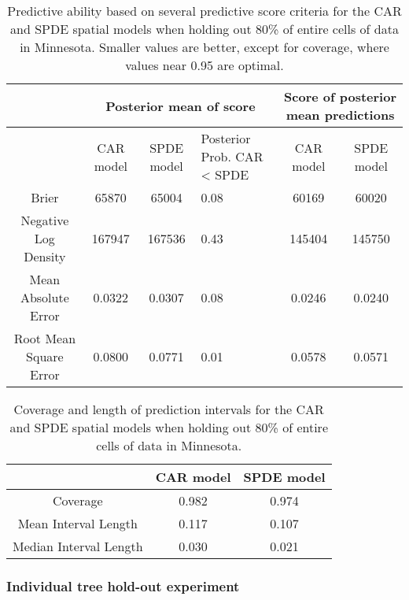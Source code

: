 \documentclass[12pt]{article}\usepackage[]{graphicx}\usepackage[]{color}
\providecommand{\tabularnewline}{\\}
\begin{document}
%
\begin{table}
\caption{Predictive ability based on several predictive score criteria for
the CAR and SPDE spatial models when holding out 80\% of entire cells
of data in Minnesota. Smaller values are better, except for coverage,
where values near 0.95 are optimal.}


\begin{tabular}{|c|c|c|>{\centering}p{3cm}|c|c|}
\hline 
 &
\multicolumn{3}{c|}{{\small{Posterior mean of score}}} &
\multicolumn{2}{c|}{{\small{Score of posterior mean predictions}}}\tabularnewline
\hline 
\hline 
 &
{\small{CAR model}} &
{\small{SPDE model}} &
{\small{Posterior Prob. CAR < SPDE}} &
{\small{CAR model}} &
{\small{SPDE model}}\tabularnewline
\hline 
{\small{Brier}} &
{\small{65870}} &
{\small{65004}} &
{\small{0.08}} &
{\small{60169}} &
{\small{60020}}\tabularnewline
\hline 
{\small{Negative Log Density}} &
{\small{167947}} &
{\small{167536}} &
{\small{0.43}} &
{\small{145404}} &
{\small{145750}}\tabularnewline
\hline 
{\small{Mean Absolute Error}} &
{\small{0.0322}} &
{\small{0.0307}} &
{\small{0.08}} &
{\small{0.0246}} &
{\small{0.0240}}\tabularnewline
\hline 
{\small{Root Mean Square Error}} &
{\small{0.0800}} &
{\small{0.0771}} &
{\small{0.01}} &
{\small{0.0578}} &
{\small{0.0571}}\tabularnewline
\hline 
\end{tabular}

\label{tab:score_cell_20percent}
\end{table}


\begin{table}
\caption{Coverage and length of prediction intervals for the CAR and SPDE spatial
models when holding out 80\% of entire cells of data in Minnesota. }


\begin{tabular}{|c|c|c|}
\hline 
 &
{\small{CAR model}} &
{\small{SPDE model}}\tabularnewline
\hline 
{\small{Coverage}} &
{\small{0.982}} &
{\small{0.974}}\tabularnewline
\hline 
{\small{Mean Interval Length}} &
{\small{0.117}} &
{\small{0.107}}\tabularnewline
\hline 
{\small{Median Interval Length}} &
{\small{0.030}} &
{\small{0.021}}\tabularnewline
\hline 
\end{tabular}

\label{tab:coverage_cell_20percent}
\end{table}



\subsubsection{Individual tree hold-out experiment}
\end{document}
